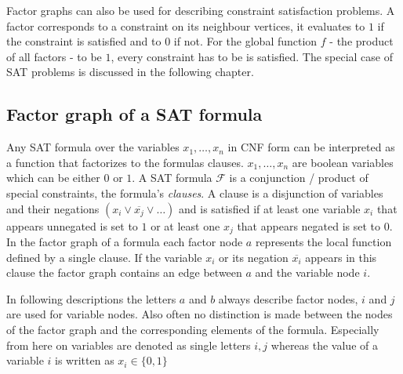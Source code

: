 \newpage
Factor graphs can also be used for describing constraint satisfaction problems. A factor corresponds to a constraint on its neighbour vertices, it evaluates to $1$ if the constraint is satisfied and to $0$ if not. For the global function $f$ - the product of all factors - to be $1$, every constraint has to be is satisfied. The special case of SAT problems is discussed in the following chapter.



\subsection{Factor graph of a SAT formula}
Any SAT formula over the variables $x_1, \ldots, x_n$ in CNF form can be interpreted as a function that factorizes to the formulas clauses. \newline
$x_1, \ldots, x_n$ are boolean variables which can be either $0$ or $1$. A SAT formula $\mathcal{F}$ is a conjunction / product of special constraints, the formula's \emph{clauses}. A clause is a disjunction of variables and their negations  $(x_i\lor \overline{x_j} \lor \ldots)$ and is satisfied if at least one variable $x_i$ that appears unnegated is set to $1$ or at least one $x_j$ that appears negated is set to $0$. \newline
In the factor graph of a formula each factor node $a$ represents the local function defined by a single clause. If the variable $x_i$ or its negation $\overline{x_i}$ appears in this clause the factor graph contains an edge between $a$ and the variable node $i$. 

In following descriptions the letters $a$ and $b$ always describe factor nodes, $i$ and $j$ are used for variable nodes. Also often no distinction is made between the nodes of the factor graph and the corresponding elements of the formula. Especially from here on variables are denoted as single letters $i, j$ whereas the value of a variable $i$ is written as $x_i \in \{0, 1\}$

